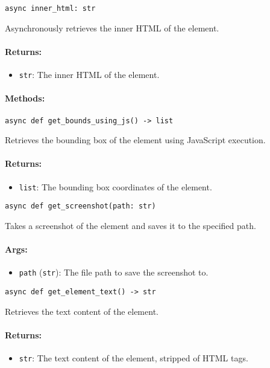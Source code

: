 \documentclass{article}
\begin{document}
\noindent\texttt{async inner\_html: str}

\noindent Asynchronously retrieves the inner HTML of the element.

\paragraph{Returns:}
\begin{itemize}
    \item \texttt{str}: The inner HTML of the element.
\end{itemize}

\paragraph{Methods:}
\noindent\texttt{async def get\_bounds\_using\_js() -> list}

\noindent Retrieves the bounding box of the element using JavaScript execution.

\paragraph{Returns:}
\begin{itemize}
    \item \texttt{list}: The bounding box coordinates of the element.
\end{itemize}

\noindent\texttt{async def get\_screenshot(path: str)}

\noindent Takes a screenshot of the element and saves it to the specified path.

\paragraph{Args:}
\begin{itemize}
    \item \texttt{path} (\texttt{str}): The file path to save the screenshot to.
\end{itemize}

\noindent\texttt{async def get\_element\_text() -> str}

\noindent Retrieves the text content of the element.

\paragraph{Returns:}
\begin{itemize}
    \item \texttt{str}: The text content of the element, stripped of HTML tags.
\end{itemize}
\end{document}
